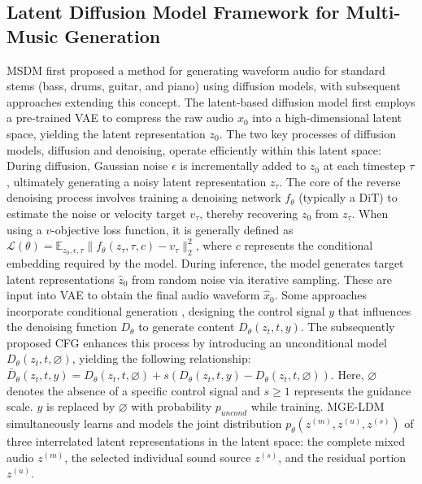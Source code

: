 \documentclass[lettersize,journal]{IEEEtran}
\begin{document}
\subsection{Latent Diffusion Model Framework for Multi-Music Generation }
MSDM first proposed a method for generating waveform audio for standard stems (bass, drums, guitar, and piano) using diffusion models, with subsequent approaches extending this concept. The latent-based diffusion model first employs a pre-trained VAE \cite{kingma2019introduction} to compress the raw audio $x_0$ into a high-dimensional latent space, yielding the latent representation $z_0$. The two key processes of diffusion models, diffusion and denoising, operate efficiently within this latent space: During diffusion, Gaussian noise $\epsilon$ is incrementally added to $z_0$ at each timestep $\tau$, ultimately generating a noisy latent representation $z_{\tau}$. The core of the reverse denoising process involves training a denoising network $f_{\theta}$ (typically a DiT\cite{peebles2023scalable}) to estimate the noise or velocity target $v_{\tau}$, thereby recovering $z_0$ from $z_{\tau}$. When using a $v$-objective loss function, it is generally defined as $\mathcal{L}(\theta)=\mathbb{E}_{z_{0},\epsilon,\tau}\lVert f_{\theta}(z_{\tau},\tau,c)-v_{\tau}\lVert _{2}^{2}$, where $c$ represents the conditional embedding required by the model. During inference, the model generates target latent representations $\hat{z}_0$ from random noise via iterative sampling. These are input into VAE to obtain the final audio waveform $\hat{x}_0$. Some approaches incorporate conditional generation \cite{dhariwal2021diffusion}, designing the control signal $y$ that influences the denoising function $D_\theta$ to generate content $D_\theta(z_t, t, y)$. The subsequently proposed CFG enhances this process by introducing an unconditional model $D_\theta(z_t, t, \varnothing)$, yielding the following relationship:$\bar{D}_\theta(z_t, t, y) = D_\theta(z_t, t, \varnothing) + s(D_\theta(z_t, t, y) - D_\theta(z_t, t, \varnothing))$. Here, $\varnothing$ denotes the absence of a specific control signal and $s \geq 1$ represents the guidance scale. $y$ is replaced by $\varnothing$ with probability $p_{\mathit{uncond}}$ while training. MGE-LDM simultaneously learns and models the joint distribution $p_{\theta}(z^{(m)},z^{(u)},z^{(s)})$ of three interrelated latent representations in the latent space: the complete mixed audio $z^{(m)}$, the selected individual sound source $z^{(s)}$, and the residual portion $z^{(u)}$.
\end{document}

